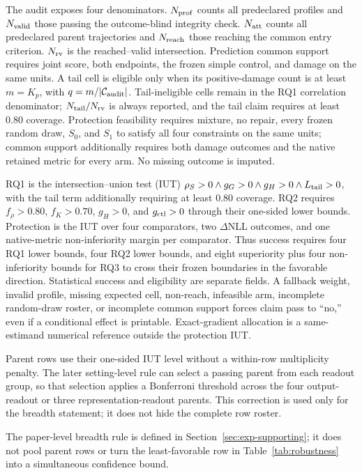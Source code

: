 The audit exposes four denominators. $N_{\rm prof}$ counts all predeclared
profiles and $N_{\rm valid}$ those passing the outcome-blind integrity check.
$N_{\rm att}$ counts all predeclared parent trajectories and $N_{\rm reach}$
those reaching the common entry criterion. $N_{\rm rv}$ is the
reached--valid intersection. Prediction common support requires joint score,
both endpoints, the frozen simple control, and damage on the same units. A
tail cell is eligible only when its positive-damage count is at least $m=K_p$,
with $q=m/|\mathcal C_{\rm audit}|$. Tail-ineligible cells remain in
the RQ1 correlation denominator; $N_{\rm tail}/N_{\rm rv}$ is always reported,
and the tail claim requires at least 0.80 coverage. Protection feasibility
requires mixture, no repair, every frozen random draw, $S_0$, and $S_1$ to
satisfy all four constraints on the same units; common support additionally
requires both damage outcomes and the native retained metric for every arm.
No missing outcome is imputed.

RQ1 is the intersection--union test (IUT)
$\rho_S>0\land g_G>0\land g_H>0\land L_{\rm tail}>0$, with the tail term
additionally requiring at least 0.80 coverage. RQ2 requires
$f_\rho>0.80$, $f_K>0.70$, $g_H>0$, and $g_{\rm ctl}>0$ through their
one-sided lower bounds. Protection is the IUT over four comparators, two
$\Delta$NLL outcomes, and one native-metric non-inferiority margin per
comparator. Thus success requires four RQ1 lower bounds, four RQ2 lower
bounds, and eight superiority plus four non-inferiority bounds for RQ3 to
cross their frozen boundaries in the favorable direction. Statistical
success and eligibility are separate
fields. A fallback weight, invalid profile, missing
expected cell, non-reach, infeasible arm, incomplete random-draw roster, or
incomplete common support forces claim pass to ``no,'' even if a conditional
effect is printable. Exact-gradient allocation is a same-estimand numerical
reference outside the protection IUT.

Parent rows use their one-sided IUT level without a within-row multiplicity
penalty. The later setting-level rule can select a passing parent from each
readout group, so that selection applies a Bonferroni threshold across the four
output-readout or three representation-readout parents. This correction is
used only for the breadth statement; it does not hide the complete row roster.

The paper-level breadth rule is defined in Section~\ref{sec:exp-supporting}; it
does not pool parent rows or turn the least-favorable row in
Table~\ref{tab:robustness} into a simultaneous confidence bound.

